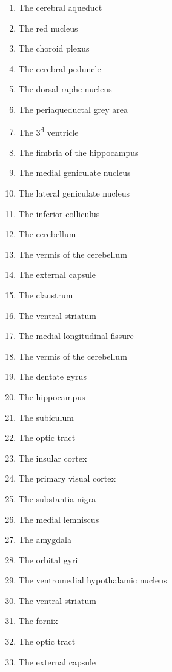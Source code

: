 \documentclass[]{book}
\providecommand{\tightlist}{%
  \setlength{\itemsep}{0pt}\setlength{\parskip}{0pt}}
\begin{document}
\begin{enumerate}
\def\labelenumi{\arabic{enumi}.}
\tightlist
\item
  The cerebral aqueduct
\item
  The red nucleus
\item
  The choroid plexus
\item
  The cerebral peduncle
\item
  The dorsal raphe nucleus
\item
  The periaqueductal grey area
\item
  The 3\textsuperscript{d} ventricle
\item
  The fimbria of the hippocampus
\item
  The medial geniculate nucleus
\item
  The lateral geniculate nucleus
\item
  The inferior colliculus
\item
  The cerebellum
\item
  The vermis of the cerebellum
\item
  The external capsule
\item
  The claustrum
\item
  The ventral striatum
\item
  The medial longitudinal fissure
\item
  The vermis of the cerebellum
\item
  The dentate gyrus
\item
  The hippocampus
\item
  The subiculum
\item
  The optic tract
\item
  The insular cortex
\item
  The primary visual cortex
\item
  The substantia nigra
\item
  The medial lemniscus
\item
  The amygdala
\item
  The orbital gyri
\item
  The ventromedial hypothalamic nucleus
\item
  The ventral striatum
\item
  The fornix
\item
  The optic tract
\item
  The external capsule
\end{enumerate}
\end{document}
